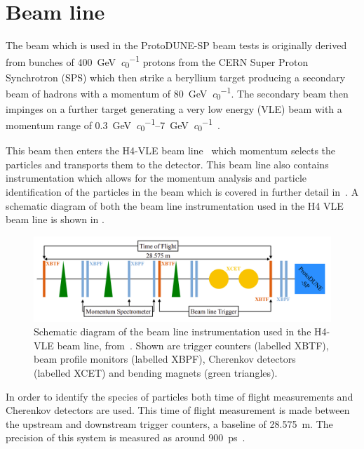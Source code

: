 \section{Beam line}
\label{sec:protodune:beam}

The beam which is used in the ProtoDUNE-SP beam tests is originally derived from bunches of \SI{400}{\GeV\per\clight} protons from the CERN Super Proton Synchrotron (SPS) which then strike a beryllium target producing a secondary beam of hadrons with a momentum of \SI{80}{\GeV\per\clight}.
The secondary beam then impinges on a further target generating a very low energy (VLE) beam with a momentum range of \SIrange{0.3}{7}{\GeV\per\clight}~\cite{protodunePerformance}.

This beam then enters the H4-VLE beam line~\cite{h4vle} which momentum selects the particles and transports them to the detector.
This beam line also contains instrumentation which allows for the momentum analysis and particle identification of the particles in the beam which is covered in further detail in~\cite{boothBeamLineInstr}.
A schematic diagram of both the beam line instrumentation used in the H4 VLE beam line is shown in .

\begin{figure}[h]
	\centering
	\includegraphics[width=\linewidth]{files/figures/protodune_detector/h4vleDiag}
	\caption[Schematic diagram of the beam line instrumentation used in the H4-VLE beam line]{Schematic diagram of the beam line instrumentation used in the H4-VLE beam line, from~\cite{protodunePerformance}. Shown are trigger counters (labelled XBTF), beam profile monitors (labelled XBPF), Cherenkov detectors (labelled XCET) and bending magnets (green triangles).}
	\label{fig:h4vleDiag}
\end{figure}

In order to identify the species of particles both time of flight measurements and Cherenkov detectors are used.
This time of flight measurement is made between the upstream and downstream trigger counters, a baseline of \SI{28.575}{\m}.
The precision of this system is measured as around \SI{900}{\pico\second}~\cite{boothBeamLineInstr}.

